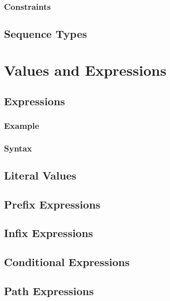 \documentclass[a4paper,oneside,12pt, extrafontsizes]{memoir}
\theoremstyle{definition}
\theoremstyle{definition}
\theoremstyle{definition}
\theoremstyle{definition}
\begin{document}
\section{Constraints}


\chapter{Sequence Types}
\label{ch:sequence-types}

\part{Values and Expressions}

\chapter{Expressions}
\label{ch:expressions}


\section{Example}


\section{Syntax}


\chapter{Literal Values}
\label{ch:literals}

\chapter{Prefix Expressions}
\label{ch:prefix}

\chapter{Infix Expressions}
\label{ch:infix}

\chapter{Conditional Expressions}
\label{ch:conditionals}

\chapter{Path Expressions}
\label{ch:paths}
\end{document}
